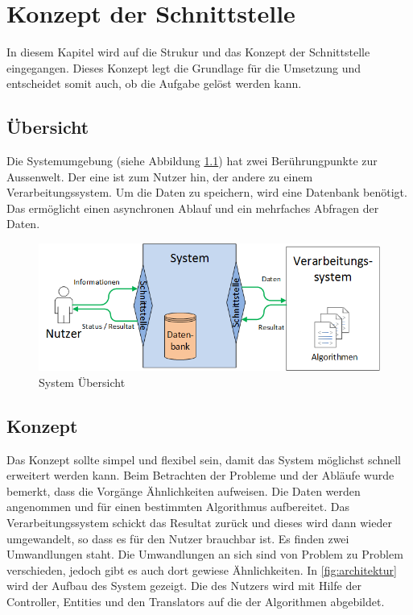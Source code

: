 %
%

\chapter{Konzept der Schnittstelle \resultAssignment{[R4]}}\label{chap.architektur}
In diesem Kapitel wird auf die Strukur und das Konzept der Schnittstelle eingegangen. Dieses Konzept legt die Grundlage für die Umsetzung und entscheidet somit auch, ob die 
Aufgabe gelöst werden kann.

\section{Übersicht}\label{architektur_uebersicht}
Die Systemumgebung (siehe Abbildung \ref{fig:system_scope}) hat zwei Berührungpunkte zur Aussenwelt. Der eine ist zum Nutzer hin, der andere zu einem Verarbeitungssystem. 
Um die Daten zu speichern, wird eine Datenbank benötigt. Das ermöglicht einen asynchronen Ablauf und ein mehrfaches Abfragen der Daten.
\begin{figure}[h]
\centering
\includegraphics[scale=0.8]{images/visio/SystemScope.png}
\caption[System Übersicht]{System Übersicht \selfmade{}}
\label{fig:system_scope}
\end{figure}

\section{Konzept}\label{arch_backend}
Das Konzept sollte simpel und flexibel sein, damit das System möglichst schnell erweitert werden kann. Beim Betrachten der Probleme und der Abläufe wurde bemerkt, dass die Vorgänge 
Ähnlichkeiten aufweisen. Die Daten werden angenommen und für einen bestimmten Algorithmus aufbereitet. Das Verarbeitungssystem schickt das Resultat zurück und dieses wird dann 
wieder umgewandelt, so dass es für den Nutzer brauchbar ist. Es finden zwei Umwandlungen staht. Die Umwandlungen an sich sind von Problem zu Problem verschieden, jedoch gibt es 
auch dort gewiese Ähnlichkeiten. In \autoref{fig:architektur} wird der Aufbau des System gezeigt. Die  des Nutzers wird mit Hilfe der Controller, Entities und 
den Translators auf die  der Algorithmen abgebildet.

